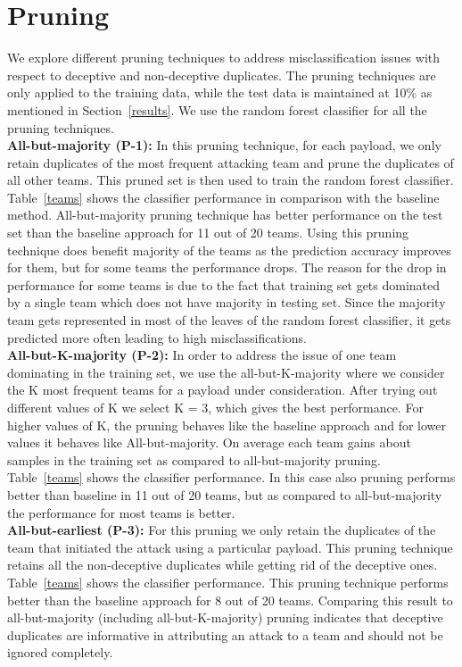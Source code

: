 \documentclass[conference]{IEEEtran}
\begin{document}
\section{Pruning}
\label{prun}
We explore different pruning techniques to address misclassification issues with respect to deceptive and non-deceptive duplicates. The pruning techniques are only applied to the training data, while the test data is maintained at 10\% as mentioned in Section~\ref{results}. We use the random forest classifier for all the pruning techniques.\\

\noindent\textbf{All-but-majority (P-1):}
In this pruning technique, for each payload, we only retain duplicates of the most frequent attacking team and prune the duplicates of all other teams. This pruned set is then used to train the random forest classifier. Table~\ref{teams} shows the classifier performance in comparison with the baseline method. All-but-majority pruning technique has better performance on the test set than the baseline approach for 11 out of 20 teams. Using this pruning technique does benefit majority of the teams as the prediction accuracy improves for them, but for some teams the performance drops. The reason for the drop in performance for some teams is due to the fact that training set gets dominated by a single team which does not have majority in testing set. Since the majority team gets represented in most of the leaves of the random forest classifier, it gets predicted more often leading to high misclassifications.\smallskip \\
\noindent\textbf{All-but-K-majority (P-2):}
In order to address the issue of one team dominating in the training set, we use the all-but-K-majority where we consider the K most frequent teams for a payload under consideration. After trying out different values of K we select K = 3, which gives the best performance. For higher values of K, the pruning behaves like the baseline approach and for lower values it behaves like All-but-majority. On average each team gains about  samples in the training set as compared to all-but-majority pruning. Table~\ref{teams} shows the classifier performance. In this case also pruning performs better than baseline in 11 out of 20 teams, but as compared to all-but-majority the performance for most teams is better.\smallskip \\ 
\noindent\textbf{All-but-earliest (P-3):}
For this pruning we only retain the duplicates of the team that initiated the attack using a particular payload. This pruning technique retains all the non-deceptive duplicates while getting rid of the deceptive ones. Table~\ref{teams} shows the classifier performance. This pruning technique performs better than the baseline approach for 8 out of 20 teams. Comparing this result to all-but-majority (including all-but-K-majority) pruning indicates that deceptive duplicates are informative in attributing an attack to a team and should not be ignored completely.\smallskip \\
\end{document}
